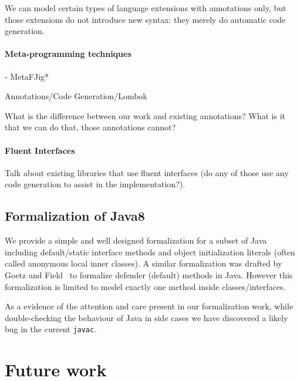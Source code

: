 We can model certain types of language extensions with annotations 
only, but those extensions do not introduce new syntax: they 
merely do automatic code generation. 

\paragraph{Meta-programming techniques}
- MetaFJig*

Annotations/Code Generation/Lombok

What is the difference between our work and existing annotations? 
What is it that we can do that, those annotations cannot?

\paragraph{Fluent Interfaces}

Talk about existing libraries that use fluent interfaces (do any of 
those use any code generation to assist in the implementation?). 



\subsection{Formalization of Java8}
We provide a simple and well designed formalization for a subset of Java including default/static interface methods and object initialization literals (often called anonymous local inner classes).
A similar formalization was drafted by
Goetz and Field~\cite{goetz12fdefenders} to formalize defender (default) methods
in Java. However this formalization is limited to model exactly one
method inside classes/interfaces.

As a evidence of the attention and care present in our formalization work, while double-checking the behaviour of Java in side cases we have discovered a likely bug in the current \texttt{javac}.

\section{Future work}

